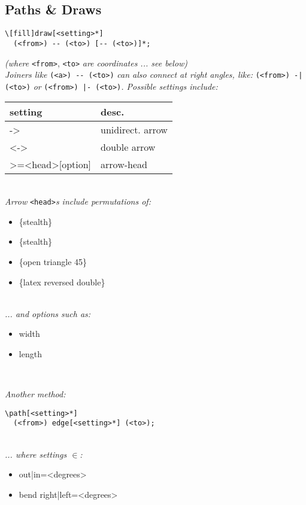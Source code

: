 \subsection*{Paths \& Draws}
\begin{code}{6.5}
\begin{lstlisting}
\[fill]draw[<setting>*]
  (<from>) -- (<to>) [-- (<to>)]*;
\end{lstlisting}
\end{code}
{\scriptsize \textit{(where } \texttt{<from>}, \texttt{<to>} \textit{are coordinates ... see below)}}\\[2mm]
\textit{Joiners like } \texttt{(<a>) -\hspace{.3mm}- (<to>)} \textit{ can also connect at right angles, like:} \texttt{(<from>) -| (<to>)} \textit{ or } \texttt{(<from>) |- (<to>)}\textit{. Possible settings include:} \\
\begin{tabularx}{5cm}{l l}
    setting & desc. \\
    \hline
    -> & unidirect. arrow \\
    <-> & double arrow \\
    >={<head>[option]} & arrow-head \\ 
\end{tabularx} \\[2mm]
\textit{Arrow }\texttt{<head>}\textit{s include permutations of:}\\
\begin{itemize}
    \item \{stealth\}
    \item \{stealth\textquotesingle\}
    \item \{open triangle 45\}
    \item \{latex reversed double\}
\end{itemize}\ \\
\textit{... and options such as: }\\
\begin{itemize}
    \item width
    \item length
\end{itemize}\ \\
\begin{code}{6.5}
\textit{Another method:}\\
\begin{lstlisting}
\path[<setting>*]
  (<from>) edge[<setting>*] (<to>);
\end{lstlisting} \\
\textit{... where settings $\in$: }\\
\begin{itemize}
    \item out|in=<degrees>
    \item bend right|left=<degrees>
\end{itemize}
\end{code}

